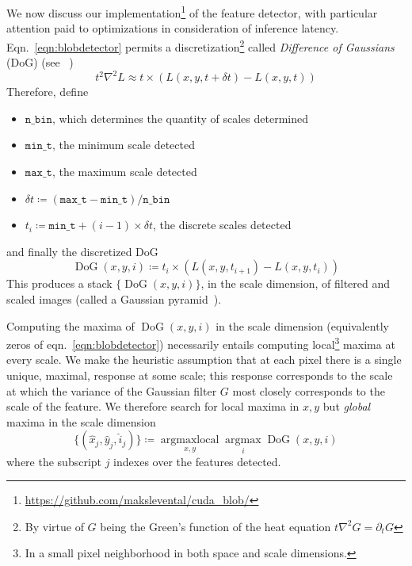 \documentclass[sigconf,nonacm]{acmart}
\begin{document}
We now discuss our implementation\footnote{\href{https://github.com/makslevental/cuda_blob/}{https://github.com/makslevental/cuda\_blob/}} of the feature detector, with particular attention paid to optimizations in consideration of inference latency.
Eqn.~\ref{eqn:blobdetector} permits a discretization\footnote{By virtue of $G$ being the Green's function of the heat equation $t \nabla^2 G = \partial_t G$} called \textit{Difference of Gaussians} (DoG) (see ~\cite{})
$$
    t^2 \nabla^2 L \approx  t \times \left(L(x,y, t + \delta t) - L(x,y, t)\right)
$$
Therefore, define
\begin{itemize}
    \item $\mathtt{n\_bin}$, which determines the quantity of scales determined
    \item $\mathtt{min\_t}$, the minimum scale detected
    \item $\mathtt{max\_t}$, the maximum scale detected
    \item $\delta t \coloneqq (\mathtt{max\_t} -\mathtt{min\_t})/\mathtt{n\_bin}$
    \item $t_i \coloneqq \mathtt{min\_t} + (i-1) \times \delta t$, the discrete scales detected
\end{itemize}
and finally the discretized DoG
\begin{equation}
    \operatorname{DoG}(x,y,i) \coloneqq t_i \times \left( L(x,y,t_{i+1})-L(x,y,t_i) \right)
    \label{eqn:dog}
\end{equation}
This produces a stack $\{ \operatorname{DoG}(x,y,i) \}$, in the scale dimension, of filtered and scaled images (called a Gaussian pyramid~\cite{}).

Computing the maxima of $\operatorname{DoG}(x,y,i)$ in the scale dimension (equivalently zeros of eqn.~\ref{eqn:blobdetector}) necessarily entails computing local\footnote{In a small pixel neighborhood in both space and scale dimensions.} maxima at every scale.
We make the heuristic assumption that at each pixel there is a single unique, maximal, response at some scale; this response corresponds to the scale at which the variance of the Gaussian filter $G$ most closely corresponds to the scale of the feature.
We therefore search for local maxima in $x,y$ but \textit{global} maxima in the scale dimension
\begin{equation}
    \{(\hat{x}_j, \hat{y}_j, \hat{i}_j)\} \coloneqq \operatorname*{argmaxlocal}_{x,y} \operatorname*{argmax}_{i} \operatorname{DoG}(x,y,i)
    \label{eqn:argmax}
\end{equation}
where the subscript $j$ indexes over the features detected.
\end{document}
